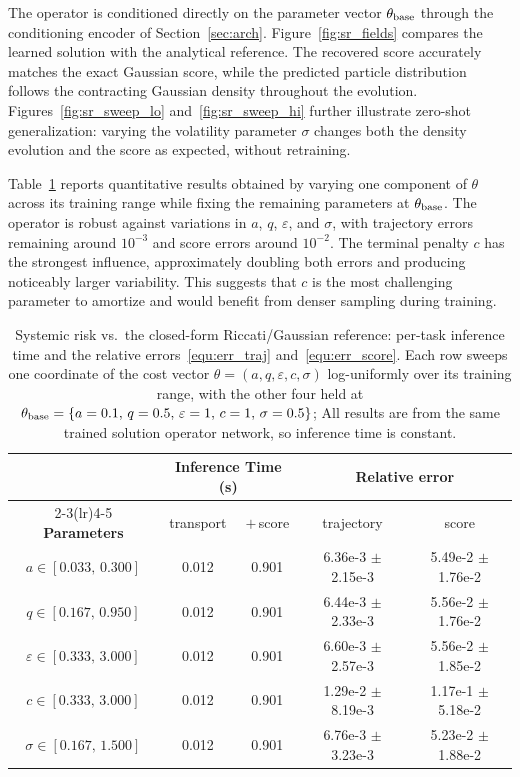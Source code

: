 \documentclass[preprint]{elsarticle}
\begin{document}
The operator is conditioned directly on the parameter vector $\theta_{\rm base}$ through the conditioning encoder of Section~\ref{sec:arch}. Figure~\ref{fig:sr_fields} compares the learned solution with the analytical reference. The recovered score accurately matches the exact Gaussian score, while the predicted particle distribution follows the contracting Gaussian density throughout the evolution. Figures~\ref{fig:sr_sweep_lo} and~\ref{fig:sr_sweep_hi} further illustrate zero-shot generalization: varying the volatility parameter $\sigma$ changes both the density evolution and the score as expected, without retraining. 

Table~\ref{tab:sr_error} reports quantitative results obtained by varying one component of $\theta$ across its training range while fixing the remaining parameters at $\theta_{\rm base}$. The operator is robust against variations in $a$, $q$, $\varepsilon$, and $\sigma$, with trajectory errors remaining around $10^{-3}$ and score errors around $10^{-2}$. The terminal penalty $c$ has the strongest influence, approximately doubling both errors and producing noticeably larger variability. This suggests that $c$ is the most challenging parameter to amortize and would benefit from denser sampling during training.


\begin{table}[!htpb]
    \centering
    \caption{Systemic risk vs.\ the closed-form Riccati/Gaussian reference:
    per-task inference time and the relative errors~\eqref{equ:err_traj}
    and~\eqref{equ:err_score}.
    Each row sweeps one coordinate of the cost vector
    $\theta=(a,q,\varepsilon,c,\sigma)$ log-uniformly over its training range,
    with the other four held at $\theta_{\rm base}=\{a=0.1,\,q=0.5,\,\varepsilon=1,\,c=1,\,\sigma=0.5\}$;
    All results are from the same trained solution operator network, so inference time is constant.}
    \label{tab:sr_error}
    \begin{tabular}{ccccc}
        \toprule
         & \multicolumn{2}{c}{\textbf{Inference Time (s)}}
            & \multicolumn{2}{c}{\textbf{Relative error}} \\
        \cmidrule(lr){2-3}\cmidrule(lr){4-5}
        \textbf{Parameters} & transport & $+$\,score
            & trajectory & score \\
        \midrule
        $a\in[0.033,\,0.300]$ & 0.012 & 0.901 & 6.36e-3 $\pm$ 2.15e-3 & 5.49e-2 $\pm$ 1.76e-2 \\
        $q\in[0.167,\,0.950]$ & 0.012 & 0.901 & 6.44e-3 $\pm$ 2.33e-3 & 5.56e-2 $\pm$ 1.76e-2 \\
        $\varepsilon\in[0.333,\,3.000]$ & 0.012 & 0.901 & 6.60e-3 $\pm$ 2.57e-3 & 5.56e-2 $\pm$ 1.85e-2 \\
        $c\in[0.333,\,3.000]$ & 0.012 & 0.901 & 1.29e-2 $\pm$ 8.19e-3 & 1.17e-1 $\pm$ 5.18e-2 \\
        $\sigma\in[0.167,\,1.500]$ & 0.012 & 0.901 & 6.76e-3 $\pm$ 3.23e-3 & 5.23e-2 $\pm$ 1.88e-2 \\
        \bottomrule
    \end{tabular}
\end{table}
\end{document}
